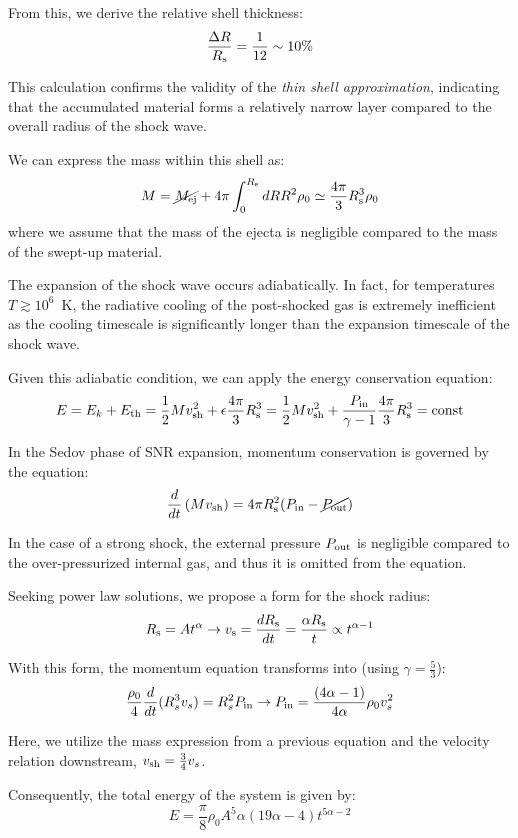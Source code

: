 From this, we derive the relative shell thickness: \[ \frac{\Delta R}{R_{\rm s}} = \frac{1}{12} \sim 10\% \] 

This calculation confirms the validity of the \emph{thin shell approximation}, indicating that the accumulated material forms a relatively narrow layer compared to the overall radius of the shock wave.

We can express the mass within this shell as:
%
\[
M = \cancel{M_{\rm ej}} + 4\pi \int_0^{R_{\rm s}} dR R^2 \rho_0 \simeq \frac{4\pi}{3} R^3_{\rm s} \rho_0
\]
%
where we assume that the mass of the ejecta is negligible compared to the mass of the swept-up material.

The expansion of the shock wave occurs adiabatically. In fact, for temperatures \( T \gtrsim 10^6 \)~K, the radiative cooling of the post-shocked gas is extremely inefficient as the cooling timescale is significantly longer than the expansion timescale of the shock wave. 

Given this adiabatic condition, we can apply the {\color{red}energy conservation equation}:
%
\[
E = E_k + E_{\rm th} 
= \frac{1}{2} M v_{\rm sh}^2 + \epsilon \frac{4\pi}{3} R^3_{\rm s} 
= \frac{1}{2} M v_{\rm sh}^2 + \frac{P_{\rm in}}{\gamma - 1} \frac{4\pi}{3} R^3_{\rm s} 
= \text{const}
\]

In the Sedov phase of SNR expansion, momentum conservation is governed by the equation:
%
\[
\frac{d}{dt} \left(M v_{\rm sh} \right) = 4\pi R^2_{\rm s} (P_{\rm in} - \cancel{P_{\rm out}})
\]

In the case of a strong shock, the external pressure \( P_{\rm out} \) is negligible compared to the over-pressurized internal gas, and thus it is omitted from the equation.

Seeking power law solutions, we propose a form for the shock radius:
%
\[ 
R_{\rm s} = A t^\alpha \rightarrow v_{\rm s} = \frac{dR_{\rm s}}{dt} = \frac{\alpha R_{\rm s}}{t} \propto t^{\alpha - 1}
\]

With this form, the momentum equation transforms into (using \(\gamma = \frac{5}{3} \)):
%
\[
\frac{\rho_0}{4} \frac{d}{dt} (R_s^3 v_s) = R_s^2 P_{\rm in} \rightarrow P_{\rm in} = \frac{(4\alpha - 1)}{4\alpha} \rho_0 v_s^2
\]

Here, we utilize the mass expression from a previous equation and the velocity relation downstream, \( v_{\rm sh} = \frac{3}{4} v_s \).

Consequently, the total energy of the system is given by:
%
\[
E = \frac{\pi}{8} \rho_0 A^5 \alpha (19 \alpha - 4) t^{5\alpha-2}
\]

